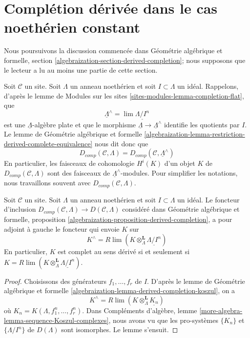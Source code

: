 \section{Complétion dérivée dans le cas noethérien constant}
\label{section-derived-completion-noetherian}

\noindent
Nous poursuivons la discussion commencée dans Géométrie algébrique et formelle, section
\ref{algebraization-section-derived-completion};
nous supposons que le lecteur a lu au moins une partie de cette section.

\medskip\noindent
Soit $\mathcal{C}$ un site. Soit $\Lambda$ un anneau noethérien
et soit $I \subset \Lambda$ un idéal. Rappelons, d'après le
lemme de Modules sur les sites \ref{sites-modules-lemma-completion-flat},
que
$$
\underline{\Lambda}^\wedge = \lim \underline{\Lambda/I^n}
$$
est une $\underline{\Lambda}$-algèbre plate et que le morphisme
$\underline{\Lambda} \to \underline{\Lambda}^\wedge$ identifie
les quotients par $I$. Le
lemme de Géométrie algébrique et formelle
\ref{algebraization-lemma-restriction-derived-complete-equivalence}
nous dit donc que
$$
D_{comp}(\mathcal{C}, \Lambda) =
D_{comp}(\mathcal{C}, \underline{\Lambda}^\wedge)
$$
En particulier, les faisceaux de cohomologie $H^i(K)$ d'un objet $K$ de
$D_{comp}(\mathcal{C}, \Lambda)$ sont des faisceaux de
$\underline{\Lambda}^\wedge$-modules.
Pour simplifier les notations, nous travaillons souvent avec
$D_{comp}(\mathcal{C}, \Lambda)$.

\begin{lemma}
\label{lemma-naive-completion}
Soit $\mathcal{C}$ un site. Soit $\Lambda$ un anneau noethérien
et soit $I \subset \Lambda$ un idéal. Le foncteur
d'inclusion
$D_{comp}(\mathcal{C}, \Lambda) \to D(\mathcal{C}, \Lambda)$
considéré dans Géométrie algébrique et formelle, proposition
\ref{algebraization-proposition-derived-completion}, a pour adjoint à gauche le foncteur qui envoie $K$ sur
$$
K^\wedge = R\lim(K \otimes_\Lambda^\mathbf{L} \underline{\Lambda/I^n})
$$
En particulier, $K$ est complet au sens dérivé si et seulement si
$K = R\lim(K \otimes_\Lambda^\mathbf{L} \underline{\Lambda/I^n})$.
\end{lemma}

\begin{proof}
Choisissons des générateurs $f_1, \ldots, f_r$ de $I$. D'après le
lemme de Géométrie algébrique et formelle
\ref{algebraization-lemma-derived-completion-koszul},
on a
$$
K^\wedge = 
R\lim (K \otimes_\Lambda^\mathbf{L} \underline{K_n})
$$
où $K_n = K(\Lambda, f_1^n, \ldots, f_r^n)$.
Dans Compléments d'algèbre, lemme \ref{more-algebra-lemma-sequence-Koszul-complexes},
nous avons vu que les pro-systèmes $\{K_n\}$ et
$\{\Lambda/I^n\}$ de $D(\Lambda)$
sont isomorphes. Le lemme s'ensuit.
\end{proof}

